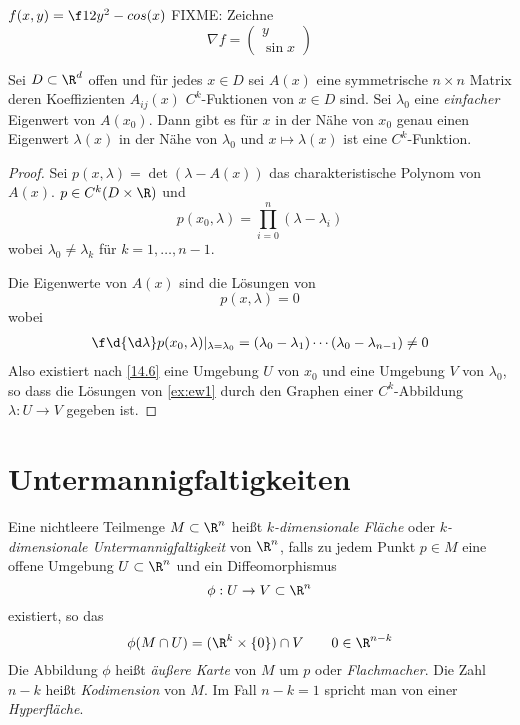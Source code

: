 \documentclass{mycourse}
\begin{document}
\begin{ex*}[Pendel!]
	$f(x,y) = \f 12y^2 -cos(x)$
	FIXME: Zeichne
	\[
		\nabla f = \begin{pmatrix}y\\ \sin x\end{pmatrix}
	\]
\end{ex*}

\begin{ex*}
	Sei $D\subset \R^d$ offen und für jedes $x\in D$ sei $A(x)$ eine symmetrische $n\times n$ Matrix deren Koeffizienten $A_{ij}(x)$ $C^k$-Fuktionen von $x\in D$ sind.
	Sei $\lambda_0$ eine \emph{einfacher} Eigenwert von $A(x_0)$.
	Dann gibt es für $x$ in der Nähe von $x_0$ genau einen Eigenwert $\lambda(x)$ in der Nähe von $\lambda_0$ und $x\mapsto \lambda(x)$ ist eine $C^k$-Funktion.
	\begin{proof}
		Sei $p(x,\lambda) = \det(\lambda-A(x))$ das charakteristische Polynom von $A(x)$.
		$p\in C^k(D\times \R)$ und
		\[
			p(x_0,\lambda) = \prod_{i=0}^n(\lambda-\lambda_i)
		\]
		wobei $\lambda_0\neq \lambda_k$ für $k=1,\dotsc,n-1$.

		Die Eigenwerte von $A(x)$ sind die Lösungen von
		\begin{equation}
			\label{ex:ew1}
			p(x,\lambda) = 0
		\end{equation}
		wobei
		\begin{align*}
			\f \d{\d\lambda}p(x_0,\lambda)|_{\lambda=\lambda_0} = (\lambda_0-\lambda_1)\dotsb (\lambda_0-\lambda_{n-1}) \neq 0
		\end{align*}
		Also existiert nach \ref{14.6} eine Umgebung $U$ von $x_0$ und eine Umgebung $V$ von $\lambda_0$, so dass die Lösungen von \eqref{ex:ew1} durch den Graphen einer $C^k$-Abbildung $\lambda:U\to V$ gegeben ist.
	\end{proof}
\end{ex*}


\section{Untermannigfaltigkeiten}


Eine nichtleere Teilmenge $M\subset \R^n$ heißt \emph{$k$-dimensionale Fläche} oder \emph{$k$-dimensionale Untermannigfaltigkeit} von $\R^n$, falls zu jedem Punkt $p\in M$ eine offene Umgebung $U\subset \R^n$ und ein Diffeomorphismus
\[
	\phi:U\to V\subset \R^n
\]
existiert, so das
\[
	\phi(M\cap U) = (\R^k\times\{0\})\cap V \qquad 0\in \R^{n-k}
\]
Die Abbildung $\phi$ heißt \emph{äußere Karte} von $M$ um $p$ oder \emph{Flachmacher}.
Die Zahl $n-k$ heißt \emph{Kodimension} von $M$.
Im Fall $n-k=1$ spricht man von einer \emph{Hyperfläche}.
\end{document}
